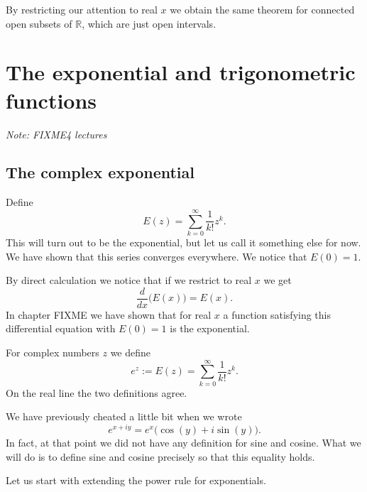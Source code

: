 \documentclass[12pt]{book}
\newcommand{\R}{{\mathbb{R}}}
\newcommand{\sectionnotes}[1]{\noindent \emph{Note: #1} \medskip \par}
\newcommand{\sectionnewpage}{\clearpage}
\theoremstyle{plain}
\theoremstyle{remark}
\theoremstyle{definition}
\theoremstyle{exercise}
\theoremstyle{example}
\begin{document}
By restricting our attention to real $x$ we obtain the same
theorem for connected open subsets of $\R$, which are just open intervals.


\sectionnewpage
\section{The exponential and trigonometric functions}
\label{sec:FIXME}

\sectionnotes{FIXME4 lectures}

\subsection{The complex exponential}

Define
\begin{equation*}
E(z) = \sum_{k=0}^\infty \frac{1}{k!} z^k .
\end{equation*}
This will turn out to be the exponential, but let us call it something else
for now.
We have shown that this series converges everywhere.
We notice that $E(0) = 1$.

By direct calculation we notice that if we restrict to real $x$ we get
\begin{equation*}
\frac{d}{dx} \bigl( E(x) \bigr) = E(x) .
\end{equation*}
In chapter FIXME we have shown that for real $x$
a function satisfying this differential
equation with $E(0) = 1$ is the exponential.

For complex numbers $z$ we define
\begin{equation*}
e^z := E(z) = 
\sum_{k=0}^\infty \frac{1}{k!} z^k .
\end{equation*}
On the real line the two definitions agree.

We have previously cheated a little bit when we wrote
\begin{equation*}
e^{x+iy} = e^x \bigl( \cos(y) + i \sin(y) \bigr) .
\end{equation*}
In fact, at that point we did not have any definition for sine and cosine.
What we will do is to define sine and cosine precisely so that this equality
holds.

Let us start with extending the power rule for exponentials.
\end{document}
